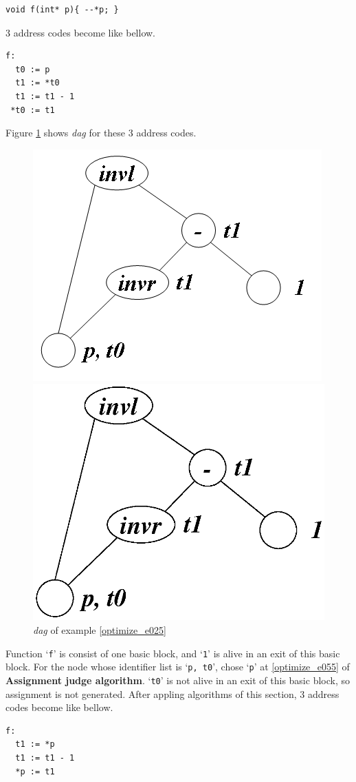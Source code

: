 \begin{Example}
\label{optimize_e025}
\begin{verbatim}
void f(int* p){ --*p; }
\end{verbatim}
3 address codes become like bellow.
\begin{verbatim}
f:
  t0 := p
  t1 := *t0
  t1 := t1 - 1
 *t0 := t1
\end{verbatim}
Figure \ref{optimize_e026} shows {\em dag} for these 3 address codes.
\begin{figure}[htbp]
\begin{center}
\begin{htmlonly}
\includegraphics[width=0.7\linewidth,height=0.552\linewidth]{opt011.png}
\end{htmlonly}
\begin{latexonly}
\includegraphics[width=0.7\linewidth,height=0.552\linewidth]{opt011.eps}
\end{latexonly}
\caption{{\em dag} of example \ref{optimize_e025}}
\label{optimize_e026}
\end{center}
\end{figure}
Function `{\tt{f}}' is consist of one basic block, and 
`{\tt{1}}' is alive in an exit of this basic block.
For the node whose identifier list is `{\tt{p, t0}}',
chose `{\tt{p}}' at \ref{optimize_e055} of {\bf Assignment judge
 algorithm}.
`{\tt{t0}}' is not alive in an exit of this basic block, so
assignment is not generated.
After appling algorithms of this section,
3 address codes become like bellow.
\begin{verbatim}
f:
  t1 := *p
  t1 := t1 - 1
  *p := t1
\end{verbatim}
\end{Example}

